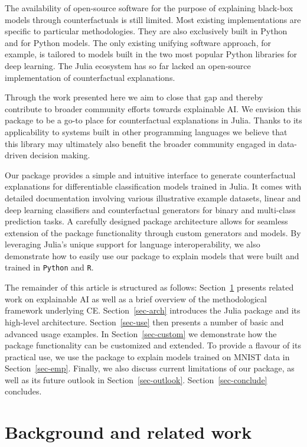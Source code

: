 \documentclass[
  letterpaper,
  DIV=11,
  numbers=noendperiod]{scrartcl}
\begin{document}
The availability of open-source software for the purpose of explaining
black-box models through counterfactuals is still limited. Most existing
implementations are specific to particular methodologies. They are also
exclusively built in Python and for Python models. The only existing
unifying software approach, for example, is tailored to models built in
the two most popular Python libraries for deep learning. The Julia
ecosystem has so far lacked an open-source implementation of
counterfactual explanations.

Through the work presented here we aim to close that gap and thereby
contribute to broader community efforts towards explainable AI. We
envision this package to be a go-to place for counterfactual
explanations in Julia. Thanks to its applicability to systems built in
other programming languages we believe that this library may ultimately
also benefit the broader community engaged in data-driven decision
making.

Our package provides a simple and intuitive interface to generate
counterfactual explanations for differentiable classification models
trained in Julia. It comes with detailed documentation involving various
illustrative example datasets, linear and deep learning classifiers and
counterfactual generators for binary and multi-class prediction tasks. A
carefully designed package architecture allows for seamless extension of
the package functionality through custom generators and models. By
leveraging Julia's unique support for language interoperability, we also
demonstrate how to easily use our package to explain models that were
built and trained in \texttt{Python} and \texttt{R}.

The remainder of this article is structured as follows:
Section~\ref{sec-related} presents related work on explainable AI as
well as a brief overview of the methodological framework underlying CE.
Section~\ref{sec-arch} introduces the Julia package and its high-level
architecture. Section~\ref{sec-use} then presents a number of basic and
advanced usage examples. In Section~\ref{sec-custom} we demonstrate how
the package functionality can be customized and extended. To provide a
flavour of its practical use, we use the package to explain models
trained on MNIST data in Section~\ref{sec-emp}. Finally, we also discuss
current limitations of our package, as well as its future outlook in
Section~\ref{sec-outlook}. Section~\ref{sec-conclude} concludes.

\hypertarget{sec-related}{%
\section{Background and related work}\label{sec-related}}
\end{document}
